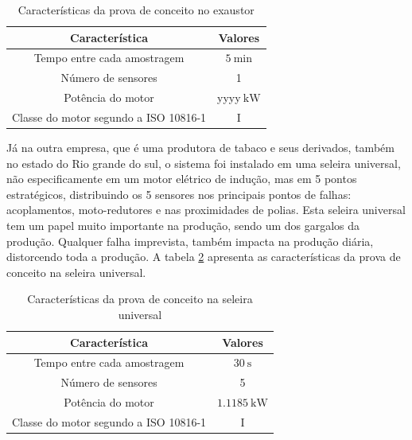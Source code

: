 \begin{table}[H]
    \caption{Características da prova de conceito no exaustor}
    \label{tab:exautor}
    \centering%
    \begin{minipage}{.55\textwidth}
      \begin{tabular*}{\textwidth}{c|c}
        \hline
        Característica                          & Valores                                    \\ \hline
        \hline
        Tempo entre cada amostragem             &  $\SI{5}{\minute}$                         \\
        Número de sensores                      &  1                                         \\ 
        Potência do motor                       &  yyyy$\SI{}{\kilo\watt}$                      \\
        Classe do motor segundo a  ISO 10816-1  &  I                                         \\
      \end{tabular*}
    \end{minipage}
  \end{table}


Já na outra empresa, que é uma produtora de tabaco e seus derivados, também no estado do Rio grande do sul, o sistema foi instalado em uma 
seleira universal, não especificamente em um motor elétrico de indução, mas em 5 pontos estratégicos, distribuindo os 5 sensores nos principais pontos 
de falhas: acoplamentos, moto-redutores e nas proximidades de polias. Esta seleira universal tem um papel muito importante na produção, sendo um dos gargalos
da produção. Qualquer falha imprevista, também impacta na produção diária, distorcendo toda a produção. A tabela \ref{tab:seleira_universal} apresenta 
as características da prova de conceito na seleira universal.

\begin{table}[H]
    \caption{Características da prova de conceito na seleira universal}
    \label{tab:seleira_universal}
    \centering%
    \begin{minipage}{.55\textwidth}
      \begin{tabular*}{\textwidth}{c|c}
        \hline
        Característica                          & Valores                                    \\ \hline
        \hline
        Tempo entre cada amostragem             &  $\SI{30}{\second}$                        \\
        Número de sensores                      &  5                                         \\ 
        Potência do motor                       &  $\SI{1.1185}{\kilo\watt}$                 \\
        Classe do motor segundo a  ISO 10816-1  &  I                                         \\
      \end{tabular*}
    \end{minipage}
  \end{table}

